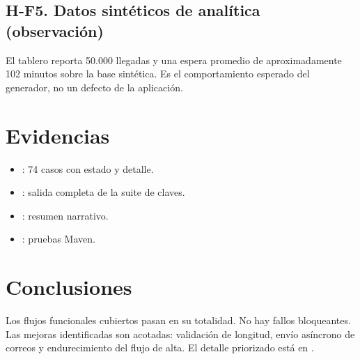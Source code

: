 \documentclass[11pt]{article}
\begin{document}
\subsection*{H-F5. Datos sintéticos de analítica (observación)}

El tablero reporta 50.000 llegadas y una espera promedio de
aproximadamente 102 minutos sobre la base sintética. Es el comportamiento
esperado del generador, no un defecto de la aplicación.

\section{Evidencias}

\begin{itemize}
  \item {}: 74 casos con
  estado y detalle.
  \item {}: salida completa de la
  suite de claves.
  \item {}: resumen narrativo.
  \item {}: pruebas Maven.
\end{itemize}

\section{Conclusiones}

Los flujos funcionales cubiertos pasan en su totalidad. No hay fallos
bloqueantes. Las mejoras identificadas son acotadas: validación de longitud,
envío asíncrono de correos y endurecimiento del flujo de alta. El detalle
priorizado está en .
\end{document}
